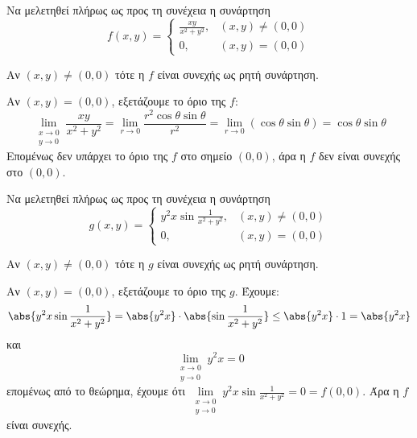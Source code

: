 \documentclass[a4paper,11pt]{report}
\begin{document}
\begin{example}
  Να μελετηθεί πλήρως ως προς τη συνέχεια η συνάρτηση 
  \[
    f(x,y) = 
    \begin{cases} 
      \frac{xy}{x^{2}+y^{2}}, & (x,y) \neq (0,0) \\ 
      0, & (x,y) = (0,0) 
    \end{cases}  
  \]
  \begin{solution}
  \item {}              
    Αν $ (x,y) \neq (0,0) $ τότε η $f$ είναι συνεχής 
    ως ρητή συνάρτηση.

    Αν $ (x,y)=(0,0) $, εξετάζουμε το όριο της $f$: 
    \[
      \lim\limits_{\substack{x\to 0 \\y \to 0}} \frac{xy}{x^{2}+y^{2}} = 
      \lim_{r \to 0} \frac{r^{2} \cos{\theta} \sin{\theta} }{ r^{2}} = 
      \lim_{r \to 0}(\cos{\theta} \sin{\theta}) = \cos{\theta} \sin{\theta} 
    \] 
    Επομένως δεν υπάρχει το όριο της $f$ στο σημείο $ (0,0) $, άρα η $f$ 
    δεν είναι συνεχής στο $ (0,0) $.
  \end{solution}
\end{example}

\begin{example}
  Να μελετηθεί πλήρως ως προς τη συνέχεια η συνάρτηση 
  \[
    g(x,y) = 
    \begin{cases} 
      y^{2}x \sin{\frac{1}{x^{2}+y^{2}}}, & (x,y) 
      \neq (0,0) \\ 0, & (x,y) = (0,0)
    \end{cases}  
  \] 
  \begin{solution}
  \item {}
    Αν $ (x,y) \neq (0,0) $ τότε η $g$ είναι συνεχής 
    ως ρητή συνάρτηση.

    Αν $ (x,y)=(0,0) $, εξετάζουμε το όριο της $g$. 
    Έχουμε:
    \[
      \abs{y^{2}x \sin{\frac{1}{x^{2}+y^{2}}}} = 
      \abs{y^{2}x}\cdot \abs{\sin{\frac{1}{x^{2}+y^{2}}}}
      \leq \abs{y^{2}x} \cdot 1 = \abs{y^{2}x}  
    \] 
    και 
    \[
      \lim\limits_{\substack{x\to 0 \\y \to 0}} y^{2}x = 0 
    \] 
    επομένως από το θεώρημα, έχουμε ότι 
    $ \lim\limits_{\substack{x\to 0 \\y \to 0}} y^{2}x 
    \sin{\frac{1}{x^{2}+y^{2}}} = 0 = f(0,0) $. Άρα η $f$ είναι συνεχής.
  \end{solution}
\end{example}
\end{document}
